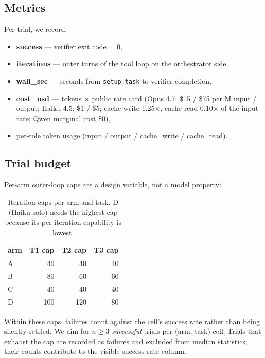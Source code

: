 \documentclass[11pt,a4paper]{article}
\begin{document}
\subsection{Metrics}

Per trial, we record:
\begin{itemize}
    \item \textbf{success} --- verifier exit code = 0,
    \item \textbf{iterations} --- outer turns of the tool loop on the orchestrator side,
    \item \textbf{wall\_sec} --- seconds from \texttt{setup\_task} to verifier completion,
    \item \textbf{cost\_usd} --- tokens $\times$ public rate card (Opus 4.7: \$15 / \$75 per M input / output; Haiku 4.5: \$1 / \$5; cache write 1.25$\times$, cache read 0.10$\times$ of the input rate; Qwen marginal cost \$0),
    \item per-role token usage (input / output / cache\_write / cache\_read).
\end{itemize}

\subsection{Trial budget}
\label{sec:budget}

Per-arm outer-loop caps are a design variable, not a model property:

\begin{table}[H]
\centering
\begin{tabular}{lrrr}
\toprule
\textbf{arm} & \textbf{T1 cap} & \textbf{T2 cap} & \textbf{T3 cap} \\
\midrule
A & 40 & 40 & 40 \\
B & 80 & 60 & 60 \\
C & 40 & 40 & 40 \\
D & 100 & 120 & 80 \\
\bottomrule
\end{tabular}
\caption{Iteration caps per arm and task. D (Haiku solo) needs the highest cap because its per-iteration capability is lowest.}
\end{table}

Within these caps, failures count against the cell's success rate rather than being silently retried. We aim for $n \geq 3$ \emph{successful} trials per (arm, task) cell. Trials that exhaust the cap are recorded as failures and excluded from median statistics; their counts contribute to the visible success-rate column.
\end{document}
